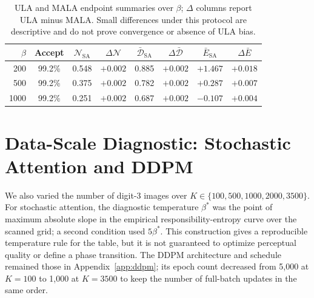 \begin{table}[H]
\centering
\caption{ULA and MALA endpoint summaries over $\beta$; $\Delta$
columns report ULA minus MALA. Small differences under this protocol are
descriptive and do not prove convergence or absence of ULA bias.}
\label{tab:mala-generation}
\small
\begin{tabular}{@{}rccccccc@{}}
\toprule
$\beta$ & Accept & $\mathcal{N}_{\text{SA}}$ & $\Delta\mathcal{N}$ & $\bar{\mathcal{D}}_{\text{SA}}$ & $\Delta\bar{\mathcal{D}}$ & $\bar{E}_{\text{SA}}$ & $\Delta\bar{E}$ \\
\midrule
200  & 99.2\% & 0.548 & $+0.002$ & 0.885 & $+0.002$ & $+1.467$ & $+0.018$ \\
500  & 99.2\% & 0.375 & $+0.002$ & 0.782 & $+0.002$ & $+0.287$ & $+0.007$ \\
1000 & 99.2\% & 0.251 & $+0.002$ & 0.687 & $+0.002$ & $-0.107$ & $+0.004$ \\
\bottomrule
\end{tabular}
\end{table}

\section{Data-Scale Diagnostic: Stochastic Attention and DDPM}\label{app:scaling}

We also varied the number of digit-3 images over
$K\in\{100,500,1000,2000,3500\}$. For stochastic attention, the diagnostic
temperature $\beta^*$ was the point of maximum absolute slope in the empirical
responsibility-entropy curve over the scanned grid; a second condition used
$5\beta^*$. This construction gives a reproducible temperature rule for the
table, but it is not guaranteed to optimize perceptual quality or define a
phase transition. The DDPM architecture and schedule remained those in
Appendix~\ref{app:ddpm}; its epoch count decreased from 5,000 at $K=100$ to
1,000 at $K=3500$ to keep the number of full-batch updates in the same order.

